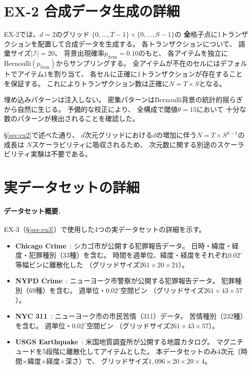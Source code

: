\section{EX-2 合成データ生成の詳細}
\label{sec:ex2_data_details}

EX-2では、$d = 2$のグリッド
$\{0,\ldots,T{-}1\} \times \{0,\ldots,S{-}1\}$の
\textbf{全}格子点に1トランザクションを配置して合成データを生成する。
各トランザクションについて、
語彙サイズ$|\mathcal{I}| = 20$、
背景出現確率$p_{\mathrm{item}} = 0.10$のもと、
各アイテムを独立にBernoulli$(p_{\mathrm{item}})$からサンプリングする。
全アイテムが不在のセルにはデフォルトでアイテム1を割り当て、
各セルに正確に1トランザクションが存在することを保証する。
これによりトランザクション数は正確に$N = T \times S$となる。

埋め込みパターンは注入しない。
密集パターンはBernoulli背景の統計的揺らぎから自然に生じる。
予備的な校正により、
全構成で閾値$\theta = 15$において
十分な数のパターンが検出されることを確認した。

\S\ref{sec:ex2}で述べた通り、
$d$次元グリッドにおける$d$の増加に伴う$N = T \times S^{d-1}$の成長は
$N$スケーラビリティに吸収されるため、
次元数に関する別途のスケーラビリティ実験は不要である。

\section{実データセットの詳細}
\label{sec:real_data_qualitative}\label{sec:dataset_details}

\paragraph{データセット概要.}
EX-3（\S\ref{sec:ex3}）で使用した4つの実データセットの詳細を示す。

\begin{itemize}
\item \textbf{Chicago Crime}~\cite{chicagocrime}:
  シカゴ市が公開する犯罪報告データ。
  日時・緯度・経度・犯罪種別（33種）を含む。
  時間を週単位、緯度・経度をそれぞれ$0.02^\circ$等幅ビンに離散化した
  （グリッドサイズ$261 \times 20 \times 21$）。
\item \textbf{NYPD Crime}~\cite{nypdcrime}:
  ニューヨーク市警察が公開する犯罪報告データ。
  犯罪種別（69種）を含む。
  週単位・$0.02^\circ$空間ビン
  （グリッドサイズ$261 \times 43 \times 57$）。
\item \textbf{NYC 311}~\cite{nyc311}:
  ニューヨーク市の市民苦情（311）データ。
  苦情種別（232種）を含む。
  週単位・$0.02^\circ$空間ビン
  （グリッドサイズ$261 \times 43 \times 57$）。
\item \textbf{USGS Earthquake}~\cite{usgseq}:
  米国地質調査所が公開する地震カタログ。
  マグニチュードを5段階に離散化してアイテムとした。
  本データセットのみ4次元（時間$\times$緯度$\times$経度$\times$深さ）で、
  グリッドサイズ$1{,}096 \times 20 \times 20 \times 4$。
\end{itemize}

